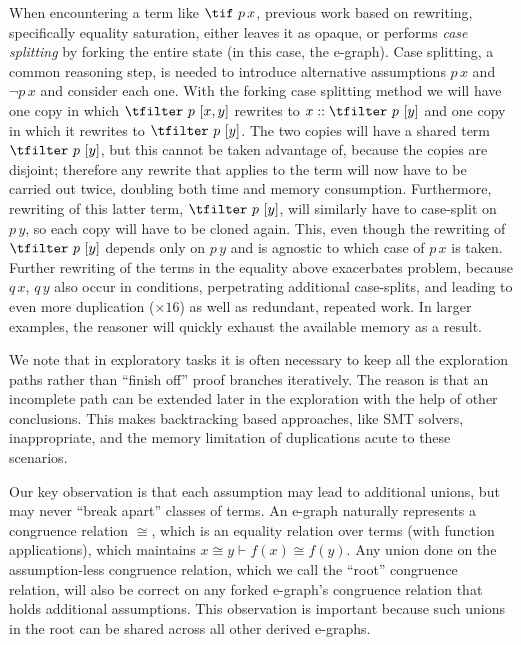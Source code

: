 When encountering a term like $\tif~p\,x$, previous work based on rewriting, specifically equality saturation, either leaves it as opaque, or performs \emph{case splitting} by forking the entire state (in this case, the e-graph).
Case splitting, a common reasoning step, is needed to introduce alternative assumptions $p\,x$ and $\lnot p\,x$ and consider each one.
With the forking case splitting method we will have one copy in which 
$\tfilter~p~[x,y]$ rewrites to $x::\tfilter~p~[y]$
and one copy in which 
it rewrites to $\tfilter~p~[y]$.
The two copies will have a shared term
$\tfilter~p~[y]$, but this cannot be taken advantage of, because the copies are disjoint;
therefore any rewrite that applies to the term will now have to be carried out twice, doubling both time and memory consumption.
Furthermore, rewriting of this latter term, $\tfilter~p~[y]$, will similarly have to case-split on $p\,y$,
so each copy will have to be cloned again.
This, even though the rewriting of $\tfilter~p~[y]$ depends only on $p\,y$ and is agnostic to which case of $p\,x$ is taken.
Further rewriting of the terms in the equality above exacerbates problem, because $q\,x$, $q\,y$ also occur in conditions, perpetrating additional case-splits, and leading to even more duplication ($\times16$) as well as redundant, repeated work.
In larger examples, the reasoner will quickly exhaust the available memory as a result.

We note that in exploratory tasks it is often necessary to keep all the exploration paths rather than ``finish off'' proof branches iteratively.
The reason is that an incomplete path can be extended later in the exploration with the help of other conclusions.
This makes backtracking based approaches, like SMT solvers, inappropriate, and the memory limitation of duplications acute to these scenarios.

Our key observation is that each assumption may lead to additional unions, but may never ``break apart'' classes of terms.
An e-graph naturally represents a congruence relation $\cong$, which is an equality relation over terms (with function applications), which  maintains $x \cong y \vdash f(x) \cong f(y)$.
Any union done on the assumption-less congruence relation, which we call the ``root'' congruence relation, will also be correct on any forked e-graph's congruence relation that holds additional assumptions.
This observation is important because such unions in the root can be shared across all other derived e-graphs.

